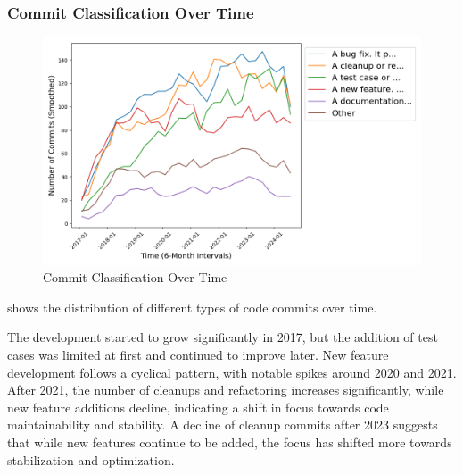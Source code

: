 \subsubsection{Commit Classification Over Time}
\begin{figure}[ht]
    \centering
    \includegraphics[width=\linewidth]{feature-analysis/timeline_commit_classification_smoothed.png}
    \caption{Commit Classification Over Time}\label{fig:timeline_commit_classification_smoothed}
\end{figure}
 shows the distribution of different types of code commits over time.

The development started to grow significantly in 2017, but the addition of test cases was limited at first and continued to improve later. New feature development follows a cyclical pattern, with notable spikes around 2020 and 2021. After 2021, the number of cleanups and refactoring increases significantly, while new feature additions decline, indicating a shift in focus towards code maintainability and stability. A decline of cleanup commits after 2023 suggests that while new features continue to be added, the focus has shifted more towards stabilization and optimization.

